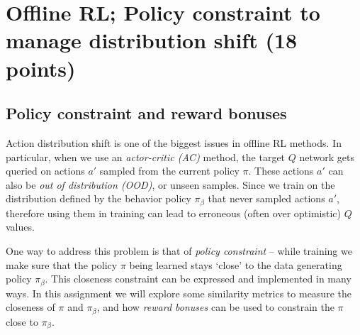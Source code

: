 \documentclass[letterpaper,12pt,addpoints]{exam}
\begin{document}
\clearpage
\section{Offline RL; Policy constraint to manage distribution shift (18 points)}\label{sec:descriptive-offline-rl}

\subsection{Policy constraint and reward bonuses}
Action distribution shift is one of the biggest issues in offline RL methods. In particular, when we use an {\it actor-critic (AC)} method, the target $Q$ network gets queried on actions $a'$ sampled from the current policy $\pi$. These actions $a'$ can also be {\it out of distribution (OOD)}, or unseen samples. Since we train on the distribution defined by the behavior policy $\pi_\beta$ that never sampled actions $a'$, therefore using them in training can lead to erroneous (often over optimistic) $Q$ values.

One way to address this problem is that of {\it policy constraint} -- while training we make sure that the policy $\pi$ being learned stays `close' to the data generating policy $\pi_\beta$. This closeness constraint can be expressed and implemented in many ways. In this assignment we will explore some similarity metrics to measure the closeness of $\pi$ and $\pi_\beta$, and how {\it reward bonuses} can be used to constrain the $\pi$ close to $\pi_\beta$.
\end{document}
